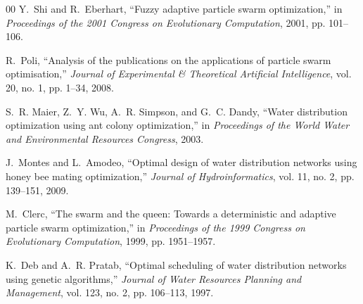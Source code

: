 \documentclass[conference]{IEEEtran}
\begin{document}
\begin{thebibliography}{00}
Y.~Shi and R.~Eberhart, ``Fuzzy adaptive particle swarm optimization,'' in \emph{Proceedings of the 2001 Congress on Evolutionary Computation}, 2001, pp. 101--106.

R.~Poli, ``Analysis of the publications on the applications of particle swarm optimisation,'' \emph{Journal of Experimental \& Theoretical Artificial Intelligence}, vol. 20, no. 1, pp. 1--34, 2008.

S.~R. Maier, Z.~Y. Wu, A.~R. Simpson, and G.~C. Dandy, ``Water distribution optimization using ant colony optimization,'' in \emph{Proceedings of the World Water and Environmental Resources Congress}, 2003.

J.~Montes and L.~Amodeo, ``Optimal design of water distribution networks using honey bee mating optimization,'' \emph{Journal of Hydroinformatics}, vol. 11, no. 2, pp. 139--151, 2009.

M.~Clerc, ``The swarm and the queen: Towards a deterministic and adaptive particle swarm optimization,'' in \emph{Proceedings of the 1999 Congress on Evolutionary Computation}, 1999, pp. 1951--1957.

K.~Deb and A.~R. Pratab, ``Optimal scheduling of water distribution networks using genetic algorithms,'' \emph{Journal of Water Resources Planning and Management}, vol. 123, no. 2, pp. 106--113, 1997.

\end{thebibliography}
\end{document}
